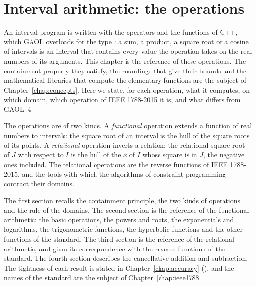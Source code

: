 \chapter{Interval arithmetic: the operations}\label{chap:arithmetic}

An interval program is written with the operators and the functions of C++,
which GAOL overloads for the type : a sum, a product, a square
root or a cosine of intervals is an interval that contains every value the
operation takes on the real numbers of its arguments. This chapter is the
reference of these operations. The containment property they satisfy, the
roundings that give their bounds and the mathematical libraries that compute
the elementary functions are the subject of Chapter~\ref{chap:concepts}. Here
we state, for each operation, what it computes, on which domain, which
operation of IEEE 1788-2015 \cite{IEEE1788:2015} it is, and what differs from
GAOL~4.

\medskip
The operations are of two kinds. A \emph{functional} operation extends a
function of real numbers to intervals: the square root of an interval is the
hull of the square roots of its points. A \emph{relational} operation inverts
a relation: the relational square root of $J$ with respect to $I$ is the hull
of the $x$ of $I$ whose square is in $J$, the negative ones included. The
relational operations are the reverse functions of IEEE 1788-2015, and the
tools with which the algorithms of constraint programming contract their
domains.

\medskip
The first section recalls the containment principle, the two kinds of
operations and the rule of the domains. The second section is the reference
of the functional arithmetic: the basic operations, the powers and roots, the
exponentials and logarithms, the trigonometric functions, the hyperbolic
functions and the other functions of the standard. The third section is the
reference of the relational arithmetic, and gives its correspondence with the
reverse functions of the standard. The fourth section describes the
cancellative addition and subtraction. The tightness of each result is
stated in Chapter~\ref{chap:accuracy} (), and the
names of the standard are the subject of Chapter~\ref{chap:ieee1788}.

